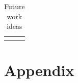\documentclass[11pt,titlepage,oneside,openany]{book}
\begin{document}
\begin{longtable}{|l|l|}
\hline
\caption{Future work ideas}
    \label{future_work}
\end{longtable}



\pagebreak
\appendix

\chapter{Appendix}
\label{cha:appendix}


\newpage


\pagestyle{empty}
\end{document}
